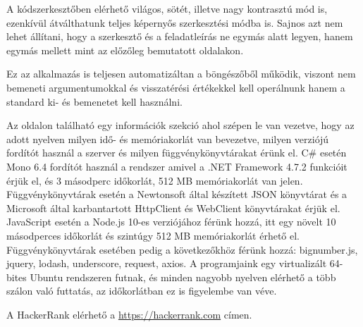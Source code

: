 A kódszerkesztőben elérhető világos, sötét, illetve nagy kontrasztú mód is, ezenkívül átválthatunk teljes képernyős szerkesztési módba is. Sajnos azt nem lehet állítani, hogy a szerkesztő és a feladatleírás ne egymás alatt legyen, hanem egymás mellett mint az előzőleg bemutatott oldalakon.

Ez az alkalmazás is teljesen automatizáltan a böngészőből működik, viszont nem bemeneti argumentumokkal és visszatérési értékekkel kell operálnunk hanem a standard ki- és bemenetet kell használni.

Az oldalon található egy információk szekció ahol szépen le van vezetve, hogy az adott nyelven milyen idő- és memóriakorlát van bevezetve, milyen verziójú fordítót használ a szerver és milyen függvénykönyvtárakat érünk el. C\# esetén Mono 6.4 fordítót használ a rendszer amivel a .NET Framework 4.7.2 funkcióit érjük el, és 3 másodperc időkorlát, 512 MB memóriakorlát van jelen. Függvénykönyvtárak esetén a Newtonsoft által készített JSON könyvtárat és a Microsoft által karbantartott HttpClient és WebClient könyvtárakat érjük el. JavaScript esetén a Node.js 10-es verziójához férünk hozzá, itt egy növelt 10 másodperces időkorlát és szintúgy 512 MB memóriakorlát érhető el. Függvénykönyvtárak esetében pedig a következőkhöz férünk hozzá: bignumber.js, jquery, lodash, underscore, request, axios. A programjaink egy virtualizált 64-bites Ubuntu rendszeren futnak, és minden nagyobb nyelven elérhető a több szálon való futtatás, az időkorlátban ez is figyelembe van véve. \cite{hackerrank_environment}

A HackerRank elérhető a \url{https://hackerrank.com} címen.

